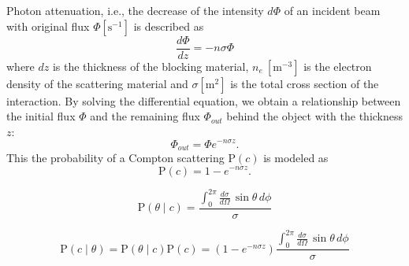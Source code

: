 \documentclass[a4paper,12pt,titlepage, twoside]{article}
\newcommand{\unit}[2]{$#1~\ensuremath{\mathrm{#2}}$}
\begin{document}
Photon attenuation, i.e., the decrease of the intensity $d\Phi$ of an incident beam with original flux $\Phi \left[\mathrm{s}^{-1}\right]$ is described as
\begin{equation}
  \frac{d\Phi}{dz} = -n\sigma\Phi
\end{equation}
where $dz$ is the thickness of the blocking material, \unit{n_e}{\left[m^{-3}\right]} is the electron density of the scattering material and $\sigma \left[\mathrm{m}^{2}\right]$ is the total cross section of the interaction.
By solving the differential equation, we obtain a relationship between the initial flux $\Phi$ and the remaining flux $\Phi_{out}$ behind the object with the thickness $z$:
\begin{equation}
  \Phi_{out} = \Phi e^{-n\sigma z}.
\end{equation}
This the probability of a Compton scattering $\mathrm{P}\left(c\right)$ is modeled as
\begin{equation}
  \mathrm{P}\left(c\right) = 1 - e^{-n\sigma z}.
\end{equation}

\begin{equation}
  \mathrm{P}\left(\theta \mid c\right) = \frac{\int_0^{2\pi} \frac{d\sigma}{d\Omega}\,\sin \theta\,d\phi}{\sigma}
\end{equation}

\begin{equation}
  \mathrm{P}\left(c \mid \theta\right) = \mathrm{P}\left(\theta \mid c\right) \mathrm{P}\left(c\right) = \left(1 - e^{-n\sigma z}\right) \frac{\int_0^{2\pi} \frac{d\sigma}{d\Omega}\,\sin \theta\,d\phi}{\sigma}
\end{equation}
\end{document}

